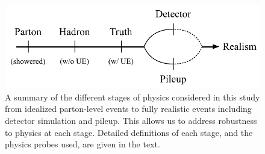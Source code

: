 \documentclass[11pt,letterpaper]{article}
\begin{document}
\begin{figure}[t]
\begin{center}
\includegraphics[width=0.75\columnwidth]{figures/realism_levels}
\end{center}
\caption{A summary of the different stages of physics considered in
  this study from idealized parton-level events to fully realistic
  events including detector simulation and pileup.
  This allows us to
  address robustness to physics at each stage.
  Detailed definitions of
  each stage, and the physics probes used, are given in the text.
   }
\label{fig:realism}
\end{figure}
\end{document}
